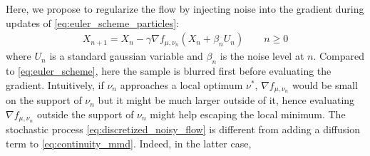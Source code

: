 Here, we propose to regularize the flow by injecting noise into the gradient during updates of \cref{eq:euler_scheme_particles}: %
\begin{align}\label{eq:discretized_noisy_flow}
	X_{n+1} = X_{n} -\gamma \nabla f_{\mu,\nu_n}(X_n+ \beta_n U_n) \qquad n\geq 0
\end{align}
where $U_n$ is a standard gaussian variable and $\beta_n$ is the noise level at $n$. Compared to \cref{eq:euler_scheme}, here the sample is blurred first before evaluating the gradient.
Intuitively, if $\nu_n$ approaches a local optimum $\nu^{*}$, $ \nabla f_{\mu,\nu_n}$ would be small on the support of $\nu_n$ but it might be much larger outside of it, hence evaluating $\nabla f_{\mu,\nu_n}$ outside the support of $\nu_n$ might help escaping the local minimum. The stochastic process \cref{eq:discretized_noisy_flow} is different from adding a diffusion term to \cref{eq:continuity_mmd}. Indeed, in the latter case, %
